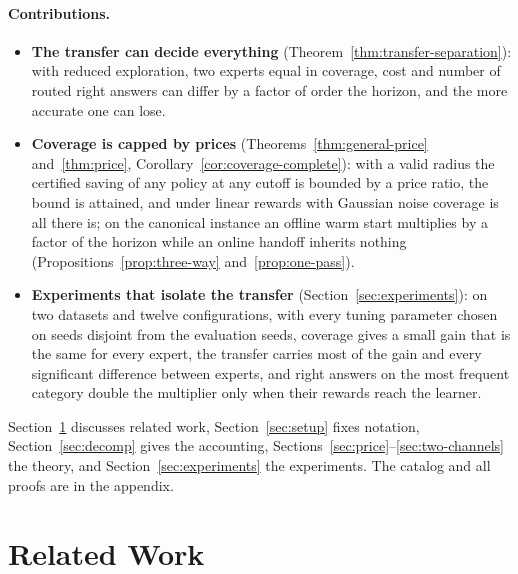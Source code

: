 \documentclass[anon]{alt2027} %
\begin{document}
\paragraph{Contributions.}
\begin{itemize}[itemsep=1pt, topsep=1pt, leftmargin=*]
\item \textbf{The transfer can decide everything}
(Theorem~\ref{thm:transfer-separation}): with reduced exploration, two
experts equal in coverage, cost and number of routed right answers can differ
by a factor of order the horizon, and the more accurate one can lose.
\item \textbf{Coverage is capped by prices}
(Theorems~\ref{thm:general-price} and~\ref{thm:price},
Corollary~\ref{cor:coverage-complete}): with a valid radius the certified
saving of any policy at any cutoff is bounded by a price ratio, the bound is
attained, and under linear rewards with Gaussian noise coverage is all there
is; on the canonical instance an offline warm start multiplies by a factor
of the horizon while an online handoff inherits nothing
(Propositions~\ref{prop:three-way} and~\ref{prop:one-pass}).
\item \textbf{Experiments that isolate the transfer}
(Section~\ref{sec:experiments}): on two datasets and twelve configurations,
with every tuning parameter chosen on seeds disjoint from the evaluation
seeds, coverage gives a small gain that is the same for every expert, the
transfer carries most of the gain and every significant difference between
experts, and right answers on the most frequent category double the
multiplier only when their rewards reach the learner.
\end{itemize}
Section~\ref{sec:related-main} discusses related work,
Section~\ref{sec:setup} fixes notation, Section~\ref{sec:decomp} gives the
accounting, Sections~\ref{sec:price}--\ref{sec:two-channels} the theory, and
Section~\ref{sec:experiments} the experiments. The catalog and all proofs
are in the appendix.

\section{Related Work}
\label{sec:related-main}
\end{document}
